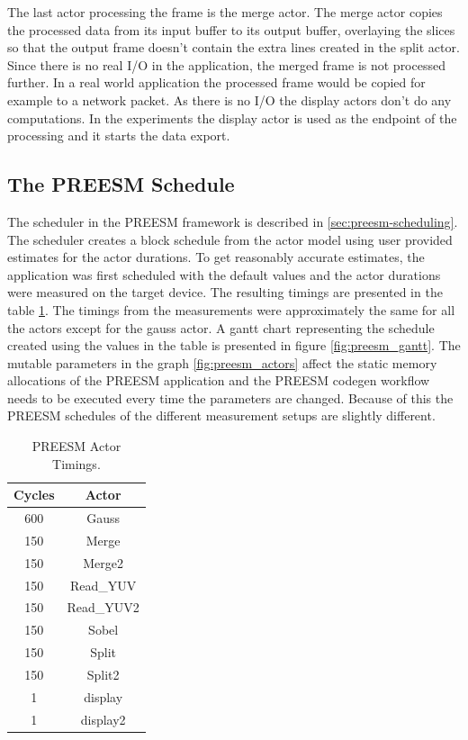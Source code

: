 The last actor processing the frame is the merge actor. The merge actor copies the processed data from its input buffer to its output buffer, overlaying the slices so that the output frame doesn't contain the extra lines created in the split actor. Since there is no real I/O in the application, the merged frame is not processed further. In a real world application the processed frame would be copied for example to a network packet. As there is no I/O the display actors don't do any computations. In the experiments the display actor is used as the endpoint of the processing and it starts the data export.

\subsection{The PREESM Schedule}
\label{subsec:preesmsched}
The scheduler in the PREESM framework is described in \ref{sec:preesm-scheduling}. The scheduler creates a block schedule from the actor model using user provided estimates for the actor durations. To get reasonably accurate estimates, the application was first scheduled with the default values and the actor durations were measured on the target device. The resulting timings are presented in the table \ref{tab:preesm_times}. The timings from the measurements were approximately the same for all the actors except for the gauss actor. A gantt chart representing the schedule created using the values in the table is presented in figure \ref{fig:preesm_gantt}. The mutable parameters in the graph \ref{fig:preesm_actors} affect the static memory allocations of the PREESM application and the PREESM codegen workflow needs to be executed every time the parameters are changed. Because of this the PREESM schedules of the different measurement setups are slightly different.

\begin{table}
    \begin{center}
        \begin{tabular}{| c | c |}

            \hline
            Cycles & Actor \\ \hline
            600 & Gauss \\ \hline
            150 & Merge \\ \hline
            150 & Merge2 \\ \hline
            150 & Read\_YUV \\ \hline
            150 & Read\_YUV2 \\ \hline
            150 & Sobel \\ \hline
            150 & Split \\ \hline
            150 & Split2 \\ \hline
            1 & display \\ \hline
            1 & display2 \\ \hline
        \end{tabular}
        \caption{PREESM Actor Timings.}
        \label{tab:preesm_times}
    \end{center}
\end{table}

